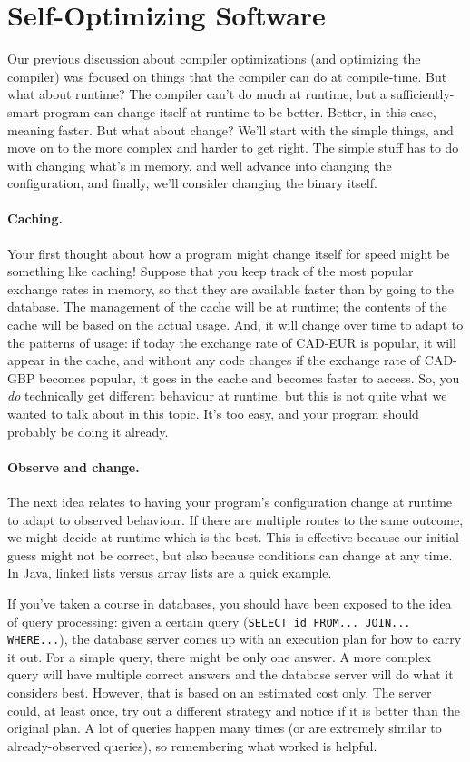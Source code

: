\documentclass[a4paper]{report}
\begin{document}
\section*{Self-Optimizing Software}
Our previous discussion about compiler optimizations (and optimizing the compiler) was focused on things that the compiler can do at compile-time. But what about runtime? The compiler can't do much at runtime, but a sufficiently-smart program can change itself at runtime to be better. Better, in this case, meaning faster. But what about change? We'll start with the simple things, and move on to the more complex  and harder to get right. The simple stuff has to do with changing what's in memory, and well advance into changing the configuration, and finally, we'll consider changing the binary itself.

\paragraph{Caching.} Your first thought about how a program might change itself for speed might be something like caching! Suppose that you keep track of the most popular exchange rates in memory, so that they are available faster than by going to the database. The management of the cache will be at runtime; the contents of the cache will be based on the actual usage. And, it will change over time to adapt to the patterns of usage: if today the exchange rate of CAD-EUR is popular, it will appear in the cache, and without any code changes if the exchange rate of CAD-GBP becomes popular, it goes in the cache and becomes faster to access. So, you \textit{do} technically get different behaviour at runtime, but this is not quite what we wanted to talk about in this topic. It's too easy, and your program should probably be doing it already.

\paragraph{Observe and change.}
The next idea relates to having your program's configuration change at runtime to adapt to observed behaviour. If there are multiple routes to the same outcome, we might decide at runtime which is the best. This is effective because our initial guess might not be correct, but also because conditions can change at any time. In Java, linked lists versus array lists are a quick example.

If you've taken a course in databases, you should have been exposed to the idea of query processing: given a certain query (\texttt{SELECT id FROM... JOIN... WHERE...}), the database server comes up with an execution plan for how to carry it out. For a simple query, there might be only one answer. A more complex query will have multiple correct answers and the database server will do what it considers best. However, that is based on an estimated cost only. The server could, at least once, try out a different strategy and notice if it is better than the original plan. A lot of queries happen many times (or are extremely similar to already-observed queries), so remembering what worked is helpful.
\end{document}
